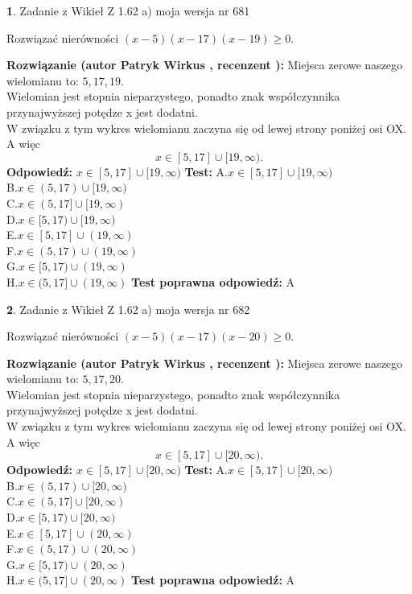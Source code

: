 \documentclass[12pt, a4paper]{article}
\theoremstyle{definition} %
\newtheorem{zad}{}
\newcommand{\zadStart}[1]{\begin{zad}#1\newline}
\newcommand{\zadStop}{\end{zad}}
\newcommand{\rozwStart}[2]{\noindent \textbf{Rozwiązanie (autor #1 , recenzent #2): }\newline}
\newcommand{\rozwStop}{\newline}
\newcommand{\odpStart}{\noindent \textbf{Odpowiedź:}\newline}
\newcommand{\odpStop}{\newline}
\newcommand{\testStart}{\noindent \textbf{Test:}\newline}
\newcommand{\testStop}{\newline}
\newcommand{\kluczStart}{\noindent \textbf{Test poprawna odpowiedź:}\newline}
\newcommand{\kluczStop}{\newline}
\begin{document}
\zadStart{Zadanie z Wikieł Z 1.62 a) moja wersja nr 681}

Rozwiązać nierówności $(x-5)(x-17)(x-19)\ge0$.
\zadStop
\rozwStart{Patryk Wirkus}{}
Miejsca zerowe naszego wielomianu to: $5, 17, 19$.\\
Wielomian jest stopnia nieparzystego, ponadto znak współczynnika przy\linebreak najwyższej potędze x jest dodatni.\\ W związku z tym wykres wielomianu zaczyna się od lewej strony poniżej osi OX. A więc $$x \in [5,17] \cup [19,\infty).$$
\rozwStop
\odpStart
$x \in [5,17] \cup [19,\infty)$
\odpStop
\testStart
A.$x \in [5,17] \cup [19,\infty)$\\
B.$x \in (5,17) \cup [19,\infty)$\\
C.$x \in (5,17] \cup [19,\infty)$\\
D.$x \in [5,17) \cup [19,\infty)$\\
E.$x \in [5,17] \cup (19,\infty)$\\
F.$x \in (5,17) \cup (19,\infty)$\\
G.$x \in [5,17) \cup (19,\infty)$\\
H.$x \in (5,17] \cup (19,\infty)$
\testStop
\kluczStart
A
\kluczStop



\zadStart{Zadanie z Wikieł Z 1.62 a) moja wersja nr 682}

Rozwiązać nierówności $(x-5)(x-17)(x-20)\ge0$.
\zadStop
\rozwStart{Patryk Wirkus}{}
Miejsca zerowe naszego wielomianu to: $5, 17, 20$.\\
Wielomian jest stopnia nieparzystego, ponadto znak współczynnika przy\linebreak najwyższej potędze x jest dodatni.\\ W związku z tym wykres wielomianu zaczyna się od lewej strony poniżej osi OX. A więc $$x \in [5,17] \cup [20,\infty).$$
\rozwStop
\odpStart
$x \in [5,17] \cup [20,\infty)$
\odpStop
\testStart
A.$x \in [5,17] \cup [20,\infty)$\\
B.$x \in (5,17) \cup [20,\infty)$\\
C.$x \in (5,17] \cup [20,\infty)$\\
D.$x \in [5,17) \cup [20,\infty)$\\
E.$x \in [5,17] \cup (20,\infty)$\\
F.$x \in (5,17) \cup (20,\infty)$\\
G.$x \in [5,17) \cup (20,\infty)$\\
H.$x \in (5,17] \cup (20,\infty)$
\testStop
\kluczStart
A
\kluczStop
\end{document}
